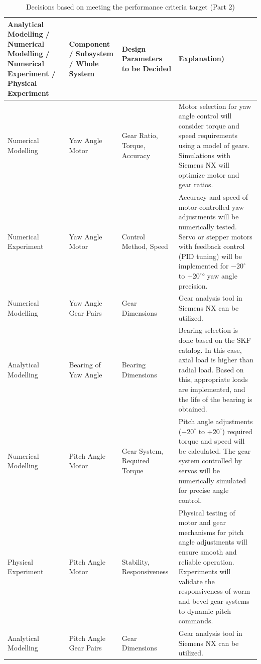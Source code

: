 \documentclass[12pt]{report}
\renewcommand{\arraystretch}{1.2} %
\begin{document}
\begin{table}[H]
\centering
\caption{Decisions based on meeting the performance criteria target (Part 2)}
\scriptsize %
\renewcommand{\arraystretch}{1.5}
\setlength{\tabcolsep}{4pt}
\begin{tabular}{|>{\raggedright\arraybackslash}p{4cm}|>{\raggedright\arraybackslash}p{3cm}|>{\raggedright\arraybackslash}p{3cm}|>{\raggedright\arraybackslash}p{6cm}|}
\hline
\textbf{Analytical Modelling / Numerical Modelling / Numerical Experiment / Physical Experiment} & \textbf{Component / Subsystem / Whole System} & \textbf{Design Parameters to be Decided} & \textbf{Explanation)} \\ \hline
Numerical Modelling & Yaw Angle Motor & Gear Ratio, Torque, Accuracy & Motor selection for yaw angle control will consider torque and speed requirements using a model of gears. Simulations with Siemens NX will optimize motor and gear ratios. \\ \hline
Numerical Experiment & Yaw Angle Motor & Control Method, Speed & Accuracy and speed of motor-controlled yaw adjustments will be numerically tested. Servo or stepper motors with feedback control (PID tuning) will be implemented for $-20^\circ$
 to $+20^\circ$° yaw angle precision. \\ \hline
Numerical Modelling & Yaw Angle Gear Pairs & Gear Dimensions & Gear analysis tool in Siemens NX can be utilized. \\ \hline
Analytical Modelling & Bearing of Yaw Angle & Bearing Dimensions & Bearing selection is done based on the SKF catalog. In this case, axial load is higher than radial load. Based on this, appropriate loads are implemented, and the life of the bearing is obtained. \\ \hline
Numerical Modelling & Pitch Angle Motor & Gear System, Required Torque & Pitch angle adjustments ($-20^\circ$
 to $+20^\circ$) required torque and speed will be calculated. The gear system controlled by servos will be numerically simulated for precise angle control. \\ \hline
Physical Experiment & Pitch Angle Motor & Stability, Responsiveness & Physical testing of motor and gear mechanisms for pitch angle adjustments will ensure smooth and reliable operation. Experiments will validate the responsiveness of worm and bevel gear systems to dynamic pitch commands. \\ \hline
Analytical Modelling & Pitch Angle Gear Pairs & Gear Dimensions & Gear analysis tool in Siemens NX can be utilized. \\ \hline
\end{tabular}
\label{tab:performance_criteria}
\end{table}
\end{document}
